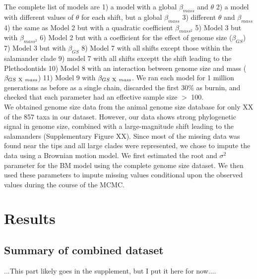 \documentclass[a4paper,11pt]{article}
\begin{document}
The complete list of models are 1) a model with a global $\beta_{mass}$ and $\theta$ 2) a model with different values of $\theta$ for each shift, but a global $\beta_{mass}$ 3) different $\theta$ and $\beta_{mass}$ 4) the same as Model 2 but with a quadratic coefficient $\beta_{mass^2}$ 5) Model 3 but with  $\beta_{mass^2}$ 6) Model 2 but with a coefficient for the effect of genome size ($\beta_{GS}$) 7) Model 3 but with $\beta_{GS}$ 8) Model 7 with all shifts except those within the salamander clade 9) model 7 with all shifts exceptt the shift leading to the Plethodontids 10) Model 8 with an interaction between genome size and mass ($\beta_{GS \ \rm{X} \ \it{mass}}$) 11) Model 9 with $\beta_{GS \ \rm{X} \ \it{mass}}$. We ran each model for 1 million generations as before as a single chain, discarded the first 30\% as burnin, and checked that each parameter had an effective sample size $>$ 100. \\

We obtained genome size data from the animal genome size database \citep{AGSdatabase} for only XX of the 857 taxa in our dataset. However, our data shows strong phylogenetic signal in genome size, combined with a large-magnitude shift leading to the salamanders (Supplementary Figure XX). Since most of the missing data was found near the tips and all large clades were represented, we chose to impute the data using a Brownian motion model. We first estimated the root and $\sigma^2$ parameter for the BM model using the complete genome size dataset. We then used these parameters to impute missing values conditional upon the observed values during the course of the MCMC. 



\section*{Results}
\subsection*{Summary of combined dataset}
...This part likely goes in the supplement, but I put it here for now....
\end{document}
